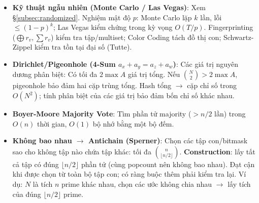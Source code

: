 \begin{itemize}
    \item \textbf{Kỹ thuật ngẫu nhiên (Monte Carlo / Las Vegas)}: Xem \S\ref{subsec:randomized}. Nghiệm mật độ $p$: Monte Carlo lặp $k$ lần, lỗi $\le(1-p)^k$; Las Vegas kiểm chứng trong kỳ vọng $O(T/p)$. Fingerprinting ($\bigoplus r_v,\sum r_v$) kiểm tra tập/multiset; Color Coding tách đồ thị con; Schwartz-Zippel kiểm tra tồn tại đại số (Tutte).

    \item \textbf{Dirichlet/Pigeonhole (4-Sum $a_x+a_y=a_z+a_w$)}: Các giá trị nguyên dương phân biệt: Có tối đa $2\max A$ giá trị tổng. Nếu $\binom N2>2\max A$, pigeonhole bảo đảm hai cặp trùng tổng. Hash tổng $\to$ cặp chỉ số trong $O(N^2)$; tính phân biệt của các giá trị bảo đảm bốn chỉ số khác nhau.

    \item \textbf{Boyer-Moore Majority Vote}: Tìm phần tử majority ($>n/2$ lần) trong $O(n)$ thời gian, $O(1)$ bộ nhớ bằng một bộ đếm.

    \item \textbf{Không bao nhau $\to$ Antichain (Sperner)}: Chọn các tập con/bitmask sao cho không tập nào chứa tập khác: tối đa $\binom n{\lfloor n/2\rfloor}$. \textbf{Construction}: lấy tất cả tập có đúng $\lfloor n/2\rfloor$ phần tử (cùng popcount nên không bao nhau). Đạt cận khi được chọn từ toàn bộ tập con; có ràng buộc thêm phải kiểm tra lại. Ví dụ: $N$ là tích $n$ prime khác nhau, chọn các ước không chia nhau $\to$ lấy tích của đúng $\lfloor n/2\rfloor$ prime.
\end{itemize}

